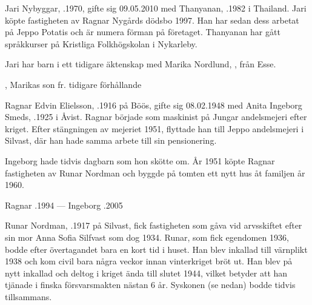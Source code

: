 


Jari  Nybyggar, .1970, gifte sig 09.05.2010 med Thanyanan, .1982 i Thailand. Jari köpte fastigheten av Ragnar Nygårds dödsbo 1997. Han har sedan dess arbetat på Jeppo Potatis och är numera förman på företaget. Thanyanan har gått språkkurser på Kristliga Folkhögskolan i Nykarleby.

Jari har barn i ett tidigare äktenskap med Marika Nordlund, , från Esse.
\begin{jhchildren}
  \item {}
  \item {}
  \item {}
  \item {}, Marikas son fr. tidigare förhållande
\end{jhchildren}


Ragnar Edvin Elielsson, .1916 på Böös, gifte sig 08.02.1948 med Anita Ingeborg Smeds, .1925 i Åvist. Ragnar började som maskinist på Jungar andelsmejeri efter kriget. Efter stängningen av mejeriet 1951, flyttade han till Jeppo andelsmejeri i Silvast, där han hade samma arbete till sin pensionering.

Ingeborg hade tidvis dagbarn som hon skötte om. År 1951 köpte Ragnar fastigheten av Runar Nordman och byggde på tomten ett nytt hus åt familjen år 1960.
\begin{jhchildren}
  \item {}
  \item {}
\end{jhchildren}

Ragnar .1994  ---  Ingeborg .2005




Runar Nordman, .1917 på Silvast, fick fastigheten som gåva vid arvsskiftet efter sin mor Anna Sofia Silfvast som dog 1934. Runar, som fick egendomen 1936, bodde efter övertagandet bara en kort tid i huset. Han blev inkallad till värnplikt 1938 och kom civil bara några veckor innan vinterkriget bröt ut. Han blev på nytt inkallad och deltog i kriget ända till slutet 1944, vilket betyder att han tjänade i finska försvarsmakten nästan 6 år. Syskonen (se nedan) bodde tidvis tillsammans.

